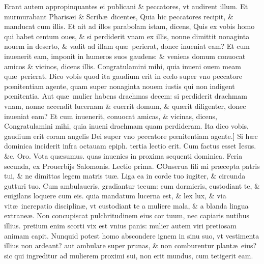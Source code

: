 \documentclass[a5paper,10pt]{book}
\def\leftmarginnote{%
	\lrmarginnote{\hskip -\marginparsep \hskip -6.5em}}
\def\rightmarginnote{%
	\lrmarginnote{\hskip\columnwidth \hskip -1em}}
\def\ae{æ}
\def\oe{œ}
\begin{document}
\begin{multicols*}{2}
Erant\leftmarginnote{\begin{flushright}c. 15.\\a\end{flushright}} autem appropinquantes ei publicani \& peccatores, vt audirent illum.
Et murmurabant Pharis\ae i \& Scrib\ae \ dicentes, Quia hic peccatores recipit, \& manducat cum illis.
Et ait ad illos parabolam istam, dicens, Quis ex vobis homo qui habet centum oues, \& si perdiderit vnam ex illis, nonne dimittit nonaginta nouem in deserto, \& vadit ad illam qu\ae \ perierat, donec inueniat eam?
Et cum inuenerit eam, imponit in humeros suos gaudens: \& veniens domum conuocat amicos \& vicinos, dicens illis.
Congratulamini mihi, quia inueni ouem meam qu\ae \ perierat.
Dico vobis quod ita gaudium erit in c\oe lo super vno peccatore p\oe nitentiam agente, quam super nonaginta nouem iustis qui non indigent p\oe nitentia.
Aut qu\ae \ mulier habens drachmas decem: si perdiderit drachmam vnam, nonne accendit lucernam \& euerrit domum, \& qu\ae rit diligenter, donec inueniat eam?
Et cum inuenerit, conuocat amicas, \& vicinas, dicens, Congratulamini mihi, quia inueni drachmam quam perdideram.
Ita dico vobis, gaudium erit coram angelis Dei super vno peccatore p\oe nitentiam agente.]
\newline {} \color{red} Si h\ae c dominica inciderit infra octauam epiph. tertia lectio erit. \color{black} Cum factus esset Iesus. \&c. \color{red} Oro. \color{black} Vota qu\ae sumus. \color{red} quas inuenies in proxima sequenti dominica. \color{black}
\newline {} \color{red} \hypertarget{MON-SECVNDA-POST-ADV}{Feria secunda,} ex Prouerbijs Salomonis. \hfill Lectio prima. \color{black}
\vspace{-1.25em}
\lettrine[lines=2]{\bfseries C}{}Onserua\rightmarginnote{ca. 6.} fili mi pr\ae cepta patris tui, \& ne dimittas legem matris tu\ae .
Liga ea in corde tuo iugiter, \& circunda gutturi tuo. Cum ambulaueris, gradiantur tecum: cum dormieris, custodiant te, \& euigilans
loquere cum eis. quia mandatum lucerna est, \& lex lux, \& via vit\ae \ increpatio disciplin\ae , vt custodiant te a muliere mala, \& a blanda lingua extrane\ae .
Non concupiscat pulchritudinem eius cor tuum, nec capiaris nutibus illius. pretium enim scorti vix est vnius panis: mulier autem viri pretiosam animam capit.
Nunquid potest homo abscondere ignem in sinu suo, vt vestimenta illius non ardeant?
aut ambulare super prunas, \& non comburentur plant\ae \ eius? sic qui ingreditur ad mulierem proximi sui, non erit mundus, cum tetigerit eam.

\end{multicols*}
\end{document}
